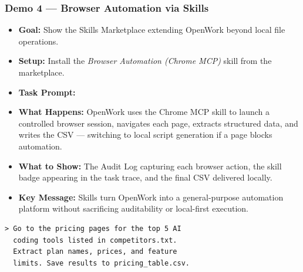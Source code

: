 \begin{frame}[fragile]\frametitle{Demo 4 — Browser Automation via Skills}
  \begin{itemize}
    \item \textbf{Goal:} Show the Skills Marketplace extending OpenWork beyond local file operations.
    \item \textbf{Setup:} Install the \textit{Browser Automation (Chrome MCP)} skill from the marketplace.
    \item \textbf{Task Prompt:}
    \item \textbf{What Happens:} OpenWork uses the Chrome MCP skill to launch a controlled browser session, navigates each page, extracts structured data, and writes the CSV — switching to local script generation if a page blocks automation.
    \item \textbf{What to Show:} The Audit Log capturing each browser action, the skill badge appearing in the task trace, and the final CSV delivered locally.
    \item \textbf{Key Message:} Skills turn OpenWork into a general-purpose automation platform without sacrificing auditability or local-first execution.
  \end{itemize}
\begin{lstlisting}
> Go to the pricing pages for the top 5 AI
  coding tools listed in competitors.txt.
  Extract plan names, prices, and feature
  limits. Save results to pricing_table.csv.
\end{lstlisting}
\end{frame}

